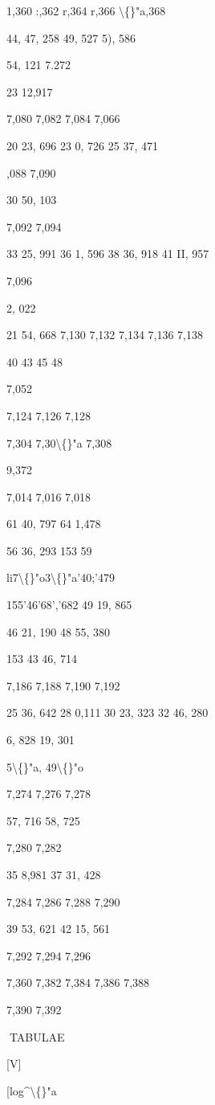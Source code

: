 \documentclass[10pt,a4paper]{article}
\begin{document}
1,360
:,362
r,364
r,366
\textbackslash\{\}"a,368

44,
47, 258
49, 527
5), 586

54, 121
7.272

23 12,917

7,080
7,082
7,084
7,066

20 23, 696
23 0, 726
25 37, 471

,088
7,090

30 50, 103

7,092
7,094

33 25, 991
36 1, 596
38 36, 918
41 II, 957

7,096

2, 022

21 54, 668
7,130
7,132
7,134
7,136
7,138

40
43
45
48

7,052

7,124
7,126
7,128

7,304
7,30\textbackslash\{\}"a
7,308

9,372

7,014
7,016
7,018

61 40, 797
64
1,478

56 36, 293
153 59

li7\textbackslash\{\}"o3\textbackslash\{\}"a'40;'479

155'46'68','682
49 19, 865

46 21, 190
48 55, 380

153 43 46, 714

7,186
7,188
7,190
7,192

25 36, 642
28 0,111
30 23, 323
32 46, 280

6, 828
19, 301

5\textbackslash\{\}"a, 49\textbackslash\{\}"o

7,274
7,276
7,278

57, 716
58, 725

7,280
7,282

35 8,981
37 31, 428

7,284
7,286
7,288
7,290

39 53, 621
42 15, 561

7,292
7,294
7,296

7,360
7,382
7,384
7,386
7,388

7,390
7,392

\newpage
TABULAE

[V]

[log\textasciicircum{}\textbackslash\{\}"a
\end{document}
